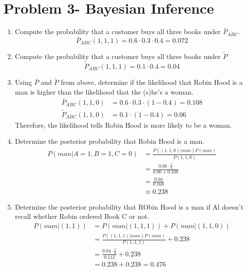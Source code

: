 \documentclass[preprint,12pt]{elsarticle}
\begin{document}
	\section{Problem 3- Bayesian Inference}
	\begin{enumerate}[label=\alph*]
		\item Compute the probability that a customer buys all three
		books under $\bar{P}_{ABC}$.
		\begin{equation*}
			\bar{P}_{ABC}(1,1,1) = 0.6\cdot 0.3\cdot 0.4 = 0.072
 		\end{equation*}
		 
		\item Compute the probability that a customer buys all three
		books under $\tilde{P}$
		\begin{equation*}
			\tilde{P}_{ABC}(1,1,1) = 0.1\cdot 0.4 = 0.04
		\end{equation*}
		 
		\item Using $\bar{P}$ and $\tilde{P}$ from above, determine if 
		the likelihood that Robin Hood is a man is higher than the 
		likelihood that the (s)he's a woman.
		\begin{align*}
			\bar{P}_{ABC}(1,1,0) &= 0.6\cdot 0.3\cdot (1-0.4) = 0.108\\
			\tilde{P}_{ABC}(1,1,0) &= 0.1\cdot (1-0.4) = 0.06
		\end{align*}
		Therefore, the likelihood tells Robin Hood is more likely to be 
		a woman.

		\item Determine the posterior probability that Robin Hood is a man.
		\begin{align*}
			P(man|A=1,B=1,C=0) &= \frac{P((1,1,0)|man)P(man)}{P(1,1,0)}\\
			&= \frac{0.06\cdot \frac{2}{3}}{0.06+0.108}\\
			&= \frac{0.04}{0.168}\\
			&\approx 0.238
		\end{align*}

		\item Determine the posterior probability that RObin Hood is a man if 
		Al doesn't recall whether Robin ordered Book C or not.
		\begin{align*}
			P(man|(1,1)) &= P(man|(1,1,1)) + P(man|(1,1,0))\\
			&= \frac{P((1,1,1)|man)P(man)}{P(1,1,1)} + 0.238\\
			&= \frac{0.04\cdot \frac{2}{3}}{0.112} + 0.238\\
			&= 0.238 + 0.238 = 0.476
		\end{align*}


\end{enumerate}
\end{document}

